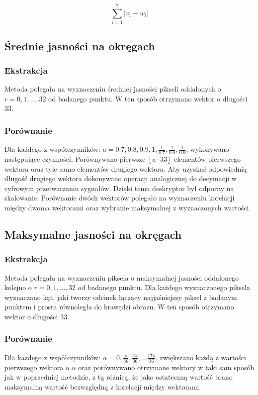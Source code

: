 \documentclass[a4paper,11pt]{article}
\begin{document}
$$ \sum_{i=1}^{7}|v_i - w_i|$$

\subsection{Średnie jasności na okręgach}

\subsubsection{Ekstrakcja}
Metoda polegała na wyznaczeniu średniej jasności pikseli oddalonych o $r = 0,1,...,32$ od badanego punktu. 
W ten sposób otrzymano wektor o długości $33$.

\subsubsection{Porównanie}
Dla każdego z współczynników: $a = 0.7, 0.8, 0.9, 1, \frac{1}{0.7}, \frac{1}{0.8}, \frac{1}{0.9}$, wykonywano następujące czynności.
Porównywano pierwsze $\left \lfloor  a \cdot 33 \right \rfloor$ elementów pierwszego wektora oraz tyle samo elementów drugiego wektora. Aby uzyskać odpowiednią długość drugiego wektora dokonywano operacji analogicznej do decymacji w cyfrowym przetwarzaniu sygnałów.
Dzięki temu deskryptor był odporny na skalowanie.
Porównanie dwóch wektorów polegało na wyznaczeniu korelacji między dwoma wektorami oraz wybranie maksymalnej z wyznaczonych wartości.

\subsection{Maksymalne jasności na okręgach}

\subsubsection{Ekstrakcja}
Metoda polegała na wyznaczeniu piksela o maksymalnej jasności oddalonego kolejno o $r = 0,1,...,32$ od badanego punktu.
Dla każdego wyznaczonego piksela wyznaczano kąt, jaki tworzy odcinek łączący najjaśniejszy piksel z badanym punktem i prosta równoległa do krawędzi obrazu. 
W ten sposób otrzymano wektor o długości $33$.

\subsubsection{Porównanie}
Dla każdego z współczynników: $\alpha = 0, \frac{\pi}{36}, \frac{2\pi}{36},...\frac{17\pi}{36}$, zwiększano każdą z wartości pierwszego wektora o $\alpha$ oraz porównywano otrzymane wektory w taki sam sposób jak w poprzedniej metodzie, z tą różnicą, że jako ostateczną wartość brano maksymalną wartość bezwzględną z korelacji między wektorami.
\end{document}
